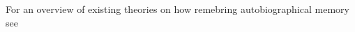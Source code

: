 \documentclass[a4paper]{article}
\title{}
\date{}
\begin{document}
\maketitle
    For an overview of existing theories on how remebring autobiographical memory see \cite{sheldon-2019-a-neurocognitive-perspective-on-the-forms-and-functions-of-autobiographical-memory-retrieval}
    
    
\end{document}
